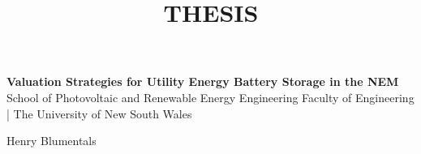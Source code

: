 \documentclass[11pt,fleqn]{book} %
\begin{document}
\title{THESIS}


\begingroup
\thispagestyle{empty}
\centering
\vspace*{2cm}
\par\normalfont\fontsize{28}{28}\sffamily\selectfont
\textbf{ Valuation Strategies for Utility Energy Battery Storage in the NEM }\\
\vspace*{0.5cm}
{\Large School of Photovoltaic and Renewable Energy Engineering   Faculty of Engineering | 
The University of New South Wales}\par %
\vspace*{0.5cm}
{\LARGE Henry Blumentals }\par %
\endgroup
\newpage 
\end{document}
